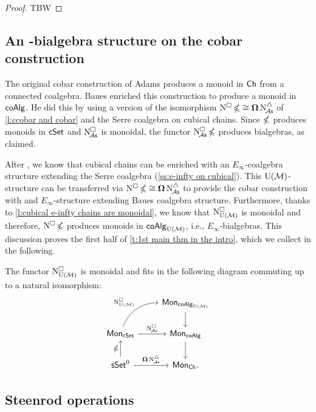 \begin{proof}
	TBW
\end{proof}







\newpage
\subsection{An \pdfEinfty-bialgebra structure on the cobar construction}\label{ss:e-infty on cobar}

The original cobar construction of Adams produces a monoid in $\mathsf{Ch}$ from a connected coalgebra. Baues enriched this construction to produce a monoid in $\mathsf{coAlg}$.
He did this by using a version of the isomorphism $\operatorname{N^{\square}} \operatorname{\mathbb{\Omega}} \cong \operatorname{\mathbf{\Omega}} \operatorname{N^{\triangle}_{\!{\mathcal{A}\mathsf{s}}}}$ of \cref{l:ccobar and cobar} and the Serre coalgebra on cubical chains.
Since $\operatorname{\mathbb{\Omega}}$ produces monoids in $\mathsf{cSet}$ and $\operatorname{N^{\square}_{\!{\mathcal{A}\mathsf{s}}}}$ is monoidal, the functor $\operatorname{N^{\square}_{\!{\mathcal{A}\mathsf{s}}}} \operatorname{\mathbb{\Omega}}$ produces bialgebras, as claimed.

After \cite{medina2022cube_einfty}, we know that cubical chains can be enriched with an $E_\infty$-coalgebra structure extending the Serre coalgebra (\cref{ss:e-infty on cubical}).
This ${\operatorname{U}(\mathcal{M})}$-structure can be transferred via $\operatorname{N^{\square}} \operatorname{\mathbb{\Omega}} \cong \operatorname{\mathbf{\Omega}} \operatorname{N^{\triangle}_{\!{\mathcal{A}\mathsf{s}}}}$ to provide the cobar construction with and $E_\infty$-structure extending Baues coalgebra structure.
Furthermore, thanks to \cref{l:cubical e-infty chains are monoidal}, we know that $\operatorname{N^{\square}_{{\operatorname{U}(\mathcal{M})}}}$ is monoidal and therefore, $\operatorname{N^{\square}} \operatorname{\mathbb{\Omega}}$ produces monoids in $\mathsf{coAlg}_{{\operatorname{U}(\mathcal{M})}}$, i.e., $E_\infty$-bialgebras.
This discussion proves the first half of \cref{t:1st main thm in the intro}, which we collect in the following.

\begin{lemma}\label{l:lift of cobar to e-infty}
	The functor $\operatorname{N^{\square}_{{\operatorname{U}(\mathcal{M})}}}$ is monoidal and fits in the following diagram commuting up to a natural isomorphism:
	\[
	\begin{tikzcd}
		& \Mon_{\coAlg_\UM} \arrow[d] \\
		\Mon_{\cSet} \arrow[ru, "\cchainsUM", out=70, in=180] \arrow[r, "\cchainsA"]
		& \Mon_{\coAlg} \arrow[d] \\
		\sSet^0 \arrow[r, "\cobar \schainsA"] \arrow[u, "\ccobar"]
		& \Mon_{\Ch}.
	\end{tikzcd}
	\]
\end{lemma}

\subsection{Steenrod operations}

